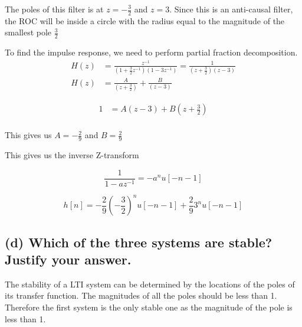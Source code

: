The poles of this filter is at $z=-\frac{3}{2}$ and $z=3$. Since this is an anti-causal filter, the ROC will be inside a circle with the radius equal to the magnitude of the smallest pole $\frac{3}{2}$

To find the impulse response, we need to perform partial fraction decomposition.
\begin{align*}
    H(z)&=\frac{z^{-1}}{\left(1+\frac{3}{2} z^{-1}\right)\left(1-3 z^{-1}\right)}=\frac{1}{\left(z+\frac{3}{2}\right)\left(z-3\right)}\\
    H(z)&=\frac{A}{\left(z+\frac{3}{2}\right)}+\frac{B}{\left(z-3\right)}
\end{align*}

\begin{align*}
    1&=A\left(z-3\right)+B\left(z+\frac{3}{2}\right)\\
\end{align*}

This gives us $A=-\frac{2}{9}$ and $B=\frac{2}{9}$

This gives us the inverse Z-transform

\begin{equation*}
    \frac{1}{1-az^{-1}}=-a^nu[-n-1]
\end{equation*}

\begin{equation*}
    h[n] = -\frac{2}{9} \left(-\frac{3}{2}\right)^n u[-n-1] + \frac{2}{9} 3^n u[-n-1]
\end{equation*}

\subsection*{(d) Which of the three systems are stable? Justify your answer.}

The stability of a LTI system can be determined by the locations of the poles of its transfer function. The magnitudes of all the poles should be less than 1. Therefore the first system is the only stable one as the magnitude of the pole is less than 1.